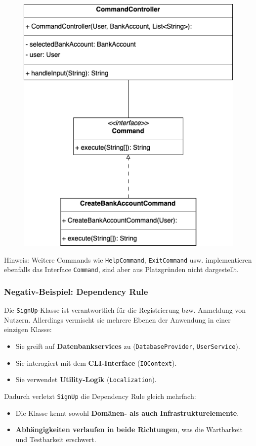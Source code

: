 \begin{figure}[htbp]
    \centering
    \includegraphics[width=0.7\linewidth]{kapitel2_architektur/DepRulPos2.drawio.png}
\end{figure}


Hinweis: Weitere Commands wie \texttt{HelpCommand}, \texttt{ExitCommand} usw. implementieren ebenfalls das Interface \texttt{Command}, sind aber aus Platzgründen nicht dargestellt.

\subsubsection*{Negativ-Beispiel: Dependency Rule}
Die \texttt{SignUp}-Klasse ist verantwortlich für die Registrierung bzw. Anmeldung von Nutzern. Allerdings vermischt sie mehrere Ebenen der Anwendung in einer einzigen Klasse:
\begin{itemize}
    \item Sie greift auf \textbf{Datenbankservices} zu (\texttt{DatabaseProvider}, \texttt{UserService}).
    \item Sie interagiert mit dem \textbf{CLI-Interface} (\texttt{IOContext}).
    \item Sie verwendet \textbf{Utility-Logik} (\texttt{Localization}).
\end{itemize}
Dadurch verletzt \texttt{SignUp} die Dependency Rule gleich mehrfach:
\begin{itemize}
    \item Die Klasse kennt sowohl \textbf{Domänen- als auch Infrastrukturelemente}.
    \item \textbf{Abhängigkeiten verlaufen in beide Richtungen}, was die Wartbarkeit und Testbarkeit erschwert.
\end{itemize}

